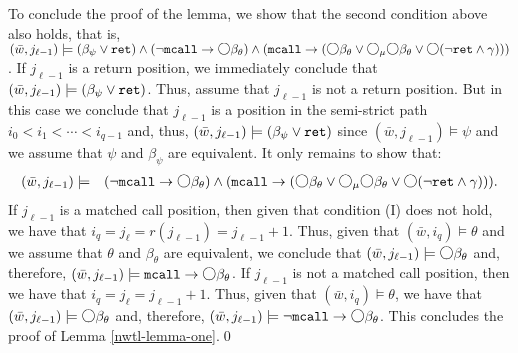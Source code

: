 \documentclass{LMCS}
\newcommand{\M}{{\mu}}
\newcommand{\w}{{\bar{w}}}
\newcommand{\dm}{\Diamond}
\newcommand{\next}{\text{\raisebox{1pt}{$\bigcirc$}}}
\theoremstyle{plain}
\theoremstyle{definition}
\newcommand{\mcall}{{\tt{mcall}}}
\newcommand{\rett}{{\tt ret}}
\newcommand{\dmm}{\dm_{\M}}
\renewcommand{\dm}{\next}
\renewcommand{\dmm}{\dm_\M}
\begin{document}
\begin{enumerate}[(a)]
To conclude the proof of the lemma, we show that the second condition
above also holds, that is, $(\w, j_{\ell-1}) \models (\beta_\psi \vee
\rett) \wedge (\neg \mcall \to \dm \beta_\theta) \wedge (\mcall \to
(\dm \beta_\theta \vee \dmm \dm \beta_\theta \vee \dm (\neg \rett
\wedge \gamma)))$. If $j_{\ell-1}$ is a return position, we immediately
conclude that $(\w, j_{\ell-1}) \models (\beta_\psi \vee
\rett)$. Thus, assume that $j_{\ell-1}$ is not a return position. But
in this case we conclude that $j_{\ell-1}$ is a position in the
semi-strict path $i_0 < i_1 < \cdots < i_{q-1}$ and, thus,
$(\w, j_{\ell-1}) \models (\beta_\psi \vee \rett)$ since $(\w, j_{\ell-1})
\models \psi$ and we assume that $\psi$ and $\beta_\psi$ are
equivalent. It only remains to show that:
\begin{eqnarray*}
(\w, j_{\ell-1}) & \models & (\neg \mcall \to \dm \beta_\theta) \wedge
(\mcall \to (\dm \beta_\theta \vee \dmm \dm \beta_\theta \vee \dm
(\neg \rett \wedge \gamma))).
\end{eqnarray*}
If $j_{\ell-1}$ is a matched call position, then given that condition
(I) does not hold, we have that $i_q = j_\ell = r(j_{\ell-1}) =
j_{\ell-1}+1$. Thus, given that $(\w, i_q)
\models \theta$ and we assume that $\theta$ and $\beta_\theta$ are
equivalent, we conclude that $(\w, j_{\ell-1}) \models \dm
\beta_\theta$ and, therefore, $(\w, j_{\ell-1}) \models \mcall \to \dm
\beta_\theta$. If $j_{\ell-1}$ is not a matched call position, then we
have that $i_q = j_\ell = j_{\ell-1}+1$. Thus, given that $(\w, i_q)
\models \theta$, we have that $(\w, j_{\ell-1}) \models \dm
\beta_\theta$ and, therefore, $(\w, j_{\ell-1}) \models \neg \mcall \to \dm
\beta_\theta$. This concludes the proof of Lemma \ref{nwtl-lemma-one}.\qed
\end{enumerate}
\end{document}
